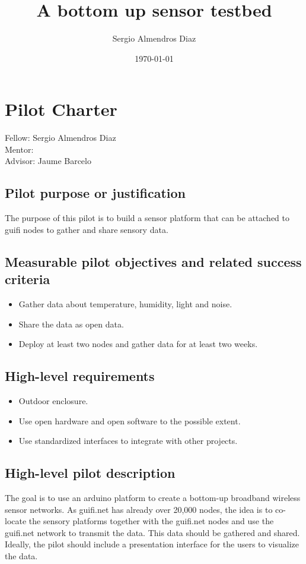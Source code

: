 \documentclass[10pt,a4paper]{article}
\title{A bottom up sensor testbed}
\author{Sergio Almendros Diaz}
\date{\today}
\begin{document}
\maketitle

\section{Pilot Charter}

Fellow: Sergio Almendros Diaz
\\
Mentor: 
\\
Advisor: Jaume Barcelo

\subsection{Pilot purpose or justification}
The purpose of this pilot is to build a sensor platform that can be attached to guifi nodes to gather and share sensory data.

\subsection{Measurable pilot objectives and related success criteria}
\begin{itemize}
\item Gather data about temperature, humidity, light and noise. 
\item Share the data as open data.
\item Deploy at least two nodes and gather data for at least two weeks.
\end{itemize}

\subsection{High-level requirements}
\begin{itemize}
\item Outdoor enclosure.
\item Use open hardware and open software to the possible extent.
\item Use standardized interfaces to integrate with other projects.
\end{itemize}

\subsection{High-level pilot description}
The goal is to use an arduino platform to create a bottom-up broadband wireless sensor networks. 
As guifi.net has already over 20,000 nodes, the idea is to co-locate the sensory platforms together with the guifi.net nodes and use the guifi.net network to transmit the data.
This data should be gathered and shared.
Ideally, the pilot should include a presentation interface for the users to visualize the data.
\end{document}

